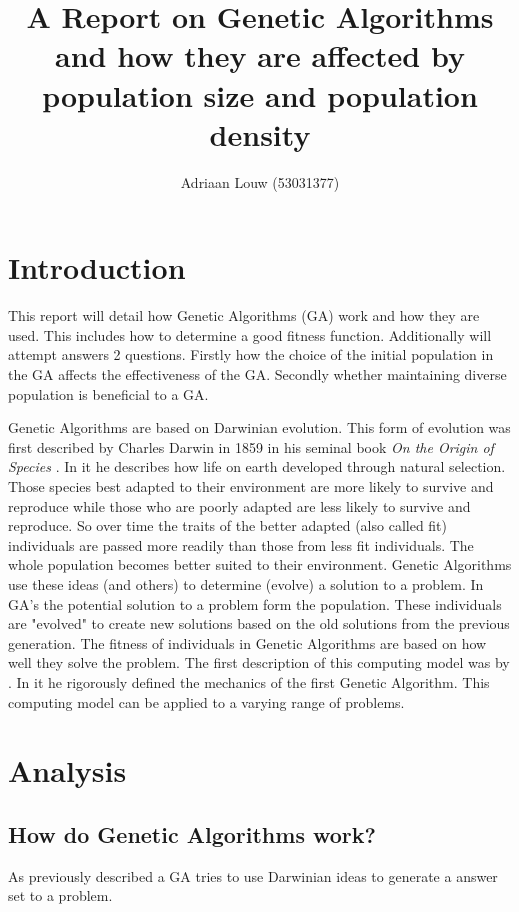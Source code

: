 \documentclass[12pt,a4paper]{report}
\title{A Report on Genetic Algorithms and how they are affected by population size and population density}
\author{ Adriaan Louw (53031377) }
\begin{document}
\maketitle

\tableofcontents

\section{Introduction}

This report will detail how Genetic Algorithms (GA) work and how they are used. This includes how to determine a good fitness function. Additionally will attempt answers 2 questions. Firstly how the choice of the initial population in the GA affects the effectiveness of the GA. Secondly whether maintaining diverse population is beneficial to a GA. 

Genetic Algorithms are based on Darwinian evolution. This form of evolution was first described by Charles Darwin in 1859 in his seminal book \textit{On the Origin of Species} \citep{darwin}. In it he describes how life on earth developed through natural selection. Those species best adapted to their environment are more likely to survive and reproduce while those who are poorly adapted are less likely to survive and reproduce. So over time the traits of the better adapted (also called fit) individuals are passed more readily than those from less fit individuals. The whole population becomes better suited to their environment. Genetic Algorithms use these ideas (and others) to determine (evolve) a solution to a problem. In GA's the potential solution to a problem form the population. These individuals are "evolved" to create new solutions based on the old solutions from the previous generation. The fitness of individuals in Genetic Algorithms are based on how well they solve the problem. The first description of this computing model was by \cite{holland}. In it he rigorously defined the mechanics of the first Genetic Algorithm. This computing model can be applied to a varying range of problems. 

\section{Analysis}
\subsection{How do Genetic Algorithms work?}

As previously described a GA tries to use Darwinian ideas to generate a answer set to a problem. 
\end{document}
